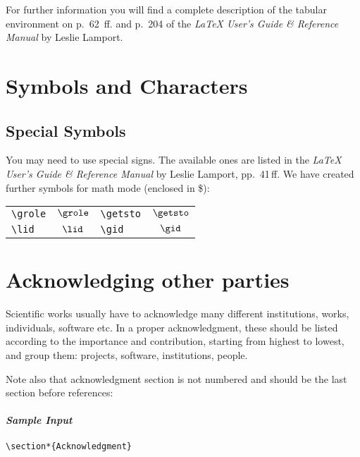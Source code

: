 \documentclass[usenatbib]{tjaa}
\begin{document}
For further information you will find a complete description of the tabular
environment on p.~62~ff. and p.~204 of the {\em \LaTeX{} User's Guide \&
Reference Manual\/} by Leslie Lamport.

\section{Symbols and Characters}

\subsection*{Special Symbols}

You may need to use special signs.  The available ones are listed in the {\em
\LaTeX{} User's Guide \& Reference Manual\/} by Leslie Lamport, pp.~41\,ff. We
have created further symbols for math mode (enclosed in \$):
\begin{center}
\begin{tabular}{l@{\hspace{1em}yields\hspace{1em}}
c@{\hspace{3em}}l@{\hspace{1em}yields\hspace{1em}}c}
\verb|\grole| & $\grole$ & \verb|\getsto| & $\getsto$\\
\verb|\lid|   & $\lid$   & \verb|\gid|    & $\gid$
\end{tabular}
\end{center}
\newpage

\section{Acknowledging other parties}

Scientific works usually have to acknowledge many different institutions,
works, individuals, software etc.
In a proper acknowledgment, these should be listed according to the
importance and contribution, starting from highest to lowest, and group them:
projects, software, institutions, people.

Note also that acknowledgment section is not numbered and should be the last
section before references:
\paragraph*{\itshape Sample Input}
\begin{verbatim}
\section*{Acknowledgment}
\end{verbatim}
\end{document}
